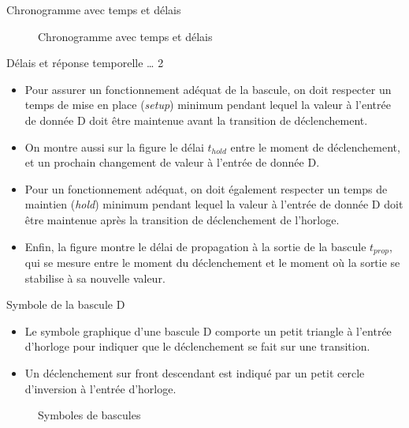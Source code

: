 \documentclass[presentation]{beamer}
\begin{document}
\begin{frame}[label={sec:org35a8f6e}]{Chronogramme avec temps et délais}
\begin{figure}[htbp]
\centering

\caption{\label{fig:orgfd574d2}Chronogramme avec temps et délais}
\end{figure}
\end{frame}

\begin{frame}[label={sec:org47e822f}]{Délais et réponse temporelle \ldots{} 2}
\begin{itemize}
\item Pour assurer un fonctionnement adéquat de la bascule, on doit respecter un temps de \alert{mise en place} (\emph{setup}) minimum pendant lequel la valeur à l'entrée de donnée D doit être maintenue \alert{avant} la transition de déclenchement.

\item On montre aussi sur la figure le délai \(t_{hold}\) entre le moment de déclenchement, et un prochain changement de valeur à l'entrée de donnée D.

\item Pour un fonctionnement adéquat, on doit également respecter un temps de \alert{maintien} (\emph{hold}) minimum pendant lequel la valeur à l'entrée de donnée D doit être maintenue \alert{après} la transition de déclenchement de l'horloge.

\item Enfin, la figure montre le délai de propagation à la sortie de la bascule \(t_{prop}\), qui se mesure entre le moment du déclenchement et le moment où la sortie se stabilise à sa nouvelle valeur.
\end{itemize}
\end{frame}

\begin{frame}[label={sec:org5d22040}]{Symbole de la bascule D}
\begin{itemize}
\item Le symbole graphique d'une bascule D comporte un petit triangle à l'entrée d'horloge pour indiquer que le déclenchement se fait sur une transition.

\item Un déclenchement sur front descendant est indiqué par un petit cercle d'inversion à l'entrée d'horloge.
\end{itemize}

\begin{figure}[htbp]
\centering

\caption{\label{fig:org2fb7a8a}Symboles de bascules}
\end{figure}
\end{frame}
\end{document}
